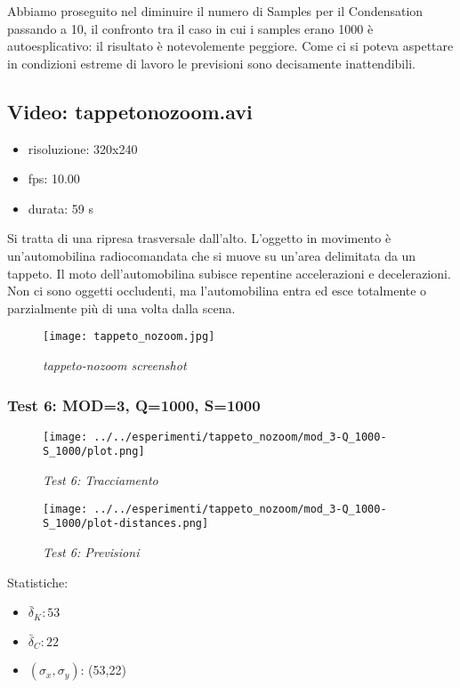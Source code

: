 Abbiamo proseguito nel diminuire il numero di Samples per il Condensation passando a 10, il confronto tra il caso in cui i samples erano 1000 è autoesplicativo: il risultato è notevolemente peggiore. Come ci si poteva aspettare in condizioni estreme di lavoro le previsioni sono decisamente inattendibili.

\newpage
\subsection{Video: tappetonozoom.avi}

\begin{itemize}
\item risoluzione: 320x240
\item fps: 10.00
\item durata: 59 s
\end{itemize}

Si tratta di una ripresa trasversale dall'alto. L'oggetto in movimento è un'automobilina radiocomandata che si muove su un'area delimitata da un tappeto. Il moto dell'automobilina subisce repentine accelerazioni e decelerazioni. Non ci sono oggetti occludenti, ma l'automobilina entra ed esce totalmente o parzialmente più di una volta dalla scena.

\begin{figure}[hb]
\centering
	\texttt{[image: tappeto\_nozoom.jpg]}
\caption{\textit{tappeto-nozoom screenshot}}
\end{figure}

\newpage
\subsubsection{Test 6: MOD=3, Q=1000, S=1000}

\begin{figure}[hb]
\centering
\texttt{[image: ../../esperimenti/tappeto\_nozoom/mod\_3-Q\_1000-S\_1000/plot.png]}
\caption{\textit{Test 6: Tracciamento}}
\end{figure}

\begin{figure}[hb]
\centering
\texttt{[image: ../../esperimenti/tappeto\_nozoom/mod\_3-Q\_1000-S\_1000/plot-distances.png]}
\caption{\textit{Test 6: Previsioni}}
\end{figure}

Statistiche:
\begin{itemize}
\item \begin{math} \bar \delta_K: 53 \end{math}
\item \begin{math} \bar \delta_C: 22 \end{math}
\item \begin{math}(\sigma_x,\sigma_y)\end{math}: (53,22)
\end{itemize}

